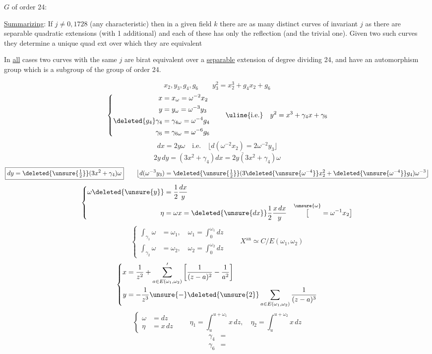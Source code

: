 $G$ of order 24:

\uline{Summarizing}: If $j\ne0,1728$ (any characteristic) then in a given field $k$ there are as many distinct curves of invariant $j$ as there are separable quadratic extensions (with 1 additional) and each of these has only the reflection  (and the trivial one). Given two such curves they determine a unique quad ext over which they are equivalent

In \uline{all} cases two curves with the same $j$ are birat equivalent over a \uline{separable} extension of degree dividing 24, and have an automorphism group which is a subgroup of the group of order 24.

\[
x_2,y_3,g_4,g_6\qquad \boxed{y_3^2=x_2^3+g_4x_2+g_6}
\]
\[
\left\{\begin{aligned}
x&=x_{\omega}=\omega^{-2}x_2\\
y&=y_{\omega}=\omega^{-3}y_3\\
\deleted{g_4}\gamma_4&=\gamma_{4\omega}=\omega^{-4}g_4\\
\gamma_6&=\gamma_{6\omega}=\omega^{-6}g_6
\end{aligned}\right.
\qquad\text{\uline{i.e.}}\quad y^2=x^3+\gamma_4x+\gamma_6
\]
\[
\boxed{dx=2y\omega}\quad\text{i.e.}\quad
\bigl\lfloor\underline{d(\omega^{-2}x_2)=2\omega^{-2}y_3}\bigr\rfloor
\]
\[
2y\,dy=(3x^2+\gamma_4)dx=2y(3x^2+\gamma_4)\omega
\]
\[
\boxed{dy=\deleted{\unsure{\tfrac12}}(3x^2+\gamma_4)\omega}\qquad
\bigl\lfloor\underline{d(\omega^{-3}y_3)=\deleted{\unsure{\tfrac12}}(3\deleted{\unsure{\omega^{-4}}}x_2^2+
\deleted{\unsure{\omega^{-4}}}g_4)\omega^{-3}}\bigr\rfloor
\]
\[
\left\{\begin{aligned}
\omega\deleted{\unsure{y}}&=\frac12\frac{dx}{y}\\
\eta&=\omega x=\deleted{\unsure{dx}}\frac12\frac{x\,dx}{y}
\quad\overset{\unsure{\omega}}{\bigl[}=\omega^{-1}x_2\bigr]
\end{aligned}\right.
\]
\[
\left\{\begin{aligned}
\int_{\gamma_1}\omega&=\omega_1,\quad \omega_1=\int_0^{\omega_1}dz\\
\int_{\gamma_2}\omega&=\omega_2,\quad \omega_2=\int_0^{\omega_2}dz
\end{aligned}\right.
\qquad X^{\mathrm{an}}\simeq C/E(\omega_1,\omega_2)
\]
\[
\left\{\begin{aligned}
x&=\frac1{z^2}+\sum_{a\in E(\omega_1,\omega_2)}'\left[\frac1{(z-a)^2}-\frac1{a^2}\right]\\
y&=-\frac1{z^3}\unsure{-}\deleted{\unsure{2}}\sum_{a\in E(\omega_1,\omega_2)}\frac1{(z-a)^3}
\end{aligned}\right.
\]
\[
\left\{\begin{aligned}
\omega&=dz\\
\eta&=x\,dz
\end{aligned}\right.
\qquad\eta_1=\int_u^{u+\omega_1}x\,dz,\quad
\eta_2=\int_u^{u+\omega_2}x\,dz
\]
\[
\begin{aligned}
\gamma_4&=\\
\gamma_6&=
\end{aligned}
\]

